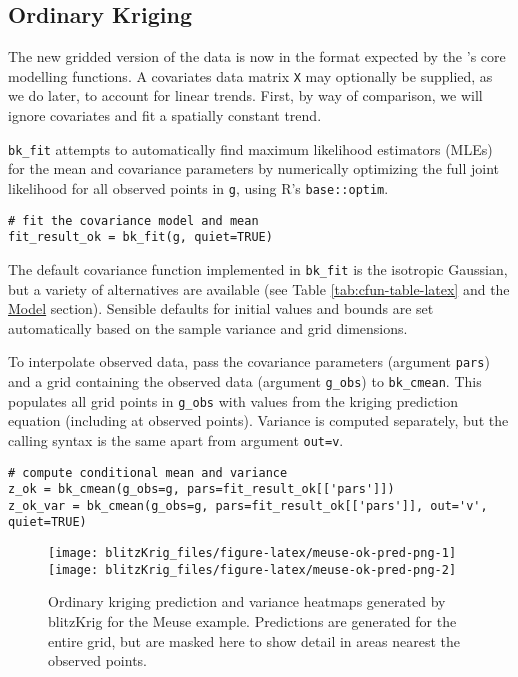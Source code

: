 \hypertarget{ordinary-kriging}{%
\subsection{Ordinary Kriging}\label{ordinary-kriging}}

The new gridded version of the data is now in the format expected by the 's core modelling functions. A covariates data matrix \texttt{X} may optionally be supplied, as we do later, to account for linear trends. First, by way of comparison, we will ignore covariates and fit a spatially constant trend.

\texttt{bk\_fit} attempts to automatically find maximum likelihood estimators (MLEs) for the mean and covariance parameters by numerically optimizing the full joint likelihood for all observed points in \texttt{g}, using R's \texttt{base::optim}.

\begin{verbatim}
# fit the covariance model and mean
fit_result_ok = bk_fit(g, quiet=TRUE)
\end{verbatim}

The default covariance function implemented in \texttt{bk\_fit} is the isotropic Gaussian, but a variety of alternatives are available
(see Table \ref{tab:cfun-table-latex} and the \protect\hyperlink{model}{Model} section). Sensible defaults for initial values and bounds are set automatically based on the sample variance and grid dimensions.

To interpolate observed data, pass the covariance parameters (argument \texttt{pars}) and a grid containing the observed data (argument \texttt{g\_obs}) to \texttt{bk\_cmean}. This populates all grid points in \texttt{g\_obs} with values from the kriging prediction equation (including at observed points). Variance is computed separately, but the calling syntax is the same apart from argument \texttt{out=\textquotesingle{}v\textquotesingle{}}.

\begin{verbatim}
# compute conditional mean and variance 
z_ok = bk_cmean(g_obs=g, pars=fit_result_ok[['pars']])
z_ok_var = bk_cmean(g_obs=g, pars=fit_result_ok[['pars']], out='v', quiet=TRUE)
\end{verbatim}

\begin{figure}
\texttt{[image: blitzKrig\_files/figure-latex/meuse-ok-pred-png-1]} \texttt{[image: blitzKrig\_files/figure-latex/meuse-ok-pred-png-2]} \caption{Ordinary kriging prediction and variance heatmaps generated by blitzKrig for the Meuse example. Predictions are generated for the entire grid, but are masked here to show detail in areas nearest the observed points.}\label{fig:meuse-ok-pred-png}
\end{figure}

